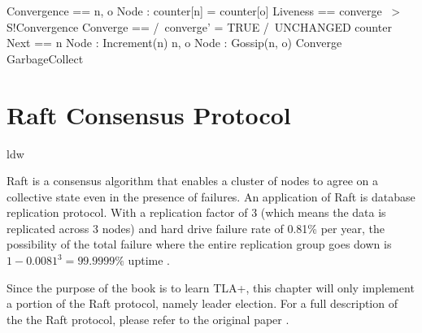 \documentclass{report}
\begin{document}
\begin{tla}
Convergence == \A n, o \in Node : counter[n] = counter[o]
Liveness == converge ~> S!Convergence
Converge ==
    /\ converge' = TRUE
    /\ UNCHANGED counter  
Next ==
  \/ \E n \in Node : Increment(n)
  \/ \E n, o \in Node : Gossip(n, o)
  \/ Converge
  \/ GarbageCollect
\end{tla}
\begin{tlatex}
%
%
%
%
%
%
%
\end{tlatex}


\chapter{Raft Consensus Protocol}ldw

Raft is a consensus algorithm that enables a cluster of nodes to agree on a
collective state even in the presence of failures. An application of Raft is
database replication protocol. With a replication factor of 3 (which means the
data is replicated across 3 nodes) and hard drive failure rate of 0.81\% per
year, the possibility of the total failure where the entire replication group
goes down is $1-0.0081^3 = 99.9999\%$ uptime \cite{backblaze}.\newline

Since the purpose of the book is to learn TLA+, this chapter will only implement
a portion of the Raft protocol, namely leader election. For a full description
of the the Raft protocol, please refer to the original paper
\cite{raft}.\newline
\end{document}
